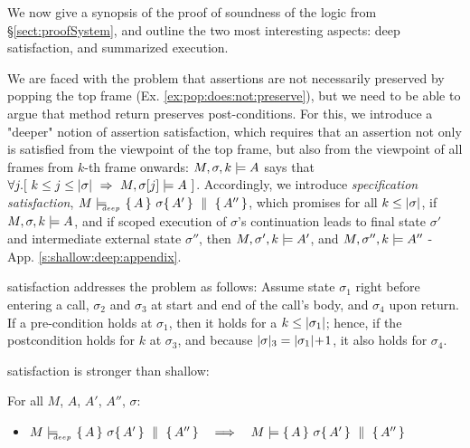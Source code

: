 

We now give a synopsis of the proof of soundness of the logic from \S \ref{sect:proofSystem}, and outline the 
 two most interesting aspects: deep satisfaction, and summarized execution.

 
\label{s:scoped:valid}
We are faced with the problem that assertions are not necessarily preserved by  popping the top frame (\cf Ex. \ref{ex:pop:does:not:preserve}), %
but we need to be able to argue that method return preserves post-conditions.
 For this, we introduce a  
"deeper" notion of assertion satisfaction, which requires that an assertion not only is satisfied from the viewpoint of the top frame, but also from the viewpoint of all frames from $k$-th frame onwards:   $ M,\sigma ,{k} \models {A} $   says that   $\forall j. [\  k\leq j \leq |\sigma| \ \Rightarrow \ M, \sigma[j] \models A \ ]$.
Accordingly, we introduce \emph{\strong specification satisfaction},  $M \models\!\!\!\!_{_{deep}}\   \{\, A \, \}\ \sigma \{\, A' \, \} \, \,\parallel\,\, \{\, A'' \, \} $, which promises for all $k\leq |\sigma|$,  
if $ M,\sigma ,{k} \models {A} $, and if  scoped execution of $\sigma$'s continuation leads to final state $\sigma'$ and intermediate external state $\sigma''$, then
 $ M,\sigma' ,{k} \models {A'} $, and  $ M,\sigma'' ,{k} \models {A''} $
 -  \cf  %
  App. \ref{s:shallow:deep:appendix}.
 
 \Strong satisfaction addresses the problem as follows: Assume    state  $\sigma_1$  right before entering a call, $\sigma_2$ and $\sigma_3$ at start and end of the call's body, and   $\sigma_4$ upon return. If a  pre-condition holds at $\sigma_1$,  then it  holds for a $k\leq |\sigma_1|$; hence,  if the postcondition holds for $k$ at $\sigma_3$, and because $|\sigma|_3= |\sigma_1|\!+\!1$, it also holds for $\sigma_4$.    

\Strong satisfaction is stronger than shallow:   
 
\begin{lemma}
For all $M$, $A$, $A'$, $A''$, $\sigma$:  
\begin{itemize}
\item
 $M \models\!\!\!\!_{_{deep}}\   \{\, A \, \}\ \sigma \{\, A' \, \} \, \,\parallel\,\, \{\, A'' \, \}    \ \ \ \Longrightarrow \ \ \   M \models  \{\, A \, \}\ \sigma \{\, A' \, \} \, \,\parallel\,\, \{\, A'' \, \} $
\end{itemize}
\end{lemma}



